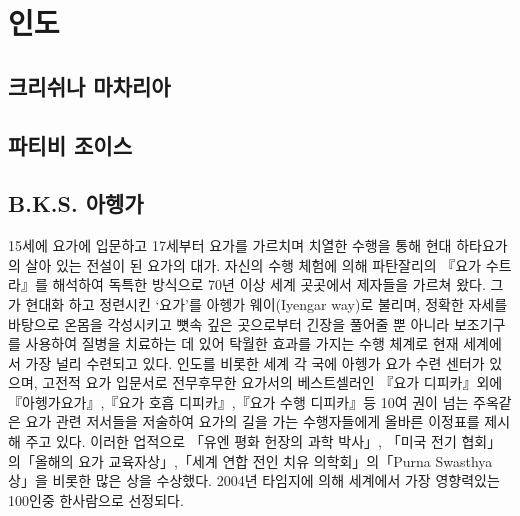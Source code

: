 \documentclass[12pt, a4paper, oneside]{book}
\let\stdsection\section
\renewcommand\section{\newpage\stdsection}
\begin{document}
\chapter{인도}
\minitoc



%
	\section{크리쉬나 마차리아 }


%
	\section{파티비 조이스}



%
	\section{B.K.S. 아헹가 }

15세에 요가에 입문하고 17세부터 요가를 가르치며 치열한 수행을 통해 현대 하타요가의 살아 있는 전설이 된 요가의 대가. 자신의 수행 체험에 의해 파탄잘리의 『요가 수트라』를 해석하여 독특한 방식으로 70년 이상 세계 곳곳에서 제자들을 가르쳐 왔다. 그가 현대화 하고 정련시킨 ‘요가’를 아헹가 웨이(Iyengar way)로 불리며, 정확한 자세를 바탕으로 온몸을 각성시키고 뼛속 깊은 곳으로부터 긴장을 풀어줄 뿐 아니라 보조기구를 사용하여 질병을 치료하는 데 있어 탁월한 효과를 가지는 수행 체계로 현재 세계에서 가장 널리 수련되고 있다. 인도를 비롯한 세계 각 국에 아헹가 요가 수련 센터가 있으며, 고전적 요가 입문서로 전무후무한 요가서의 베스트셀러인 『요가 디피카』외에 『아헹가요가』,『요가 호흡 디피카』,『요가 수행 디피카』등 10여 권이 넘는 주옥같은 요가 관련 저서들을 저술하여 요가의 길을 가는 수행자들에게 올바른 이정표를 제시해 주고 있다. 
이러한 업적으로 「유엔 평화 헌장의 과학 박사」, 「미국 전기 협회」의「올해의 요가 교육자상」,「세계 연합 전인 치유 의학회」의「Purna Swasthya상」을 비롯한 많은 상을 수상했다. 2004년 타임지에 의해 세계에서 가장 영향력있는 100인중 한사람으로 선정되다.


%
\end{document}

